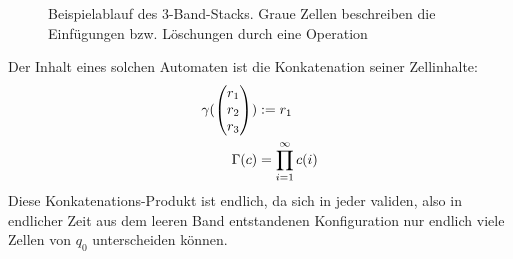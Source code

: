 \documentclass{article}
\begin{document}
\begin{figure}[h]
    \caption{Beispielablauf des 3-Band-Stacks. Graue Zellen beschreiben die Einfügungen bzw. Löschungen durch eine Operation}
\end{figure}
Der Inhalt eines solchen Automaten ist die Konkatenation seiner Zellinhalte:
\begin{align*}
    \gamma(\begin{pmatrix}r_1\\r_2\\r_3\end{pmatrix}) &:= r_1 \\
    \Gamma(c) &= \prod^\infty_{i=1} c(i)
\end{align*}
Diese Konkatenations-Produkt ist endlich, da sich in jeder validen, also in endlicher Zeit aus dem leeren Band entstandenen Konfiguration nur endlich viele Zellen von $q_0$ unterscheiden können.
\end{document}
